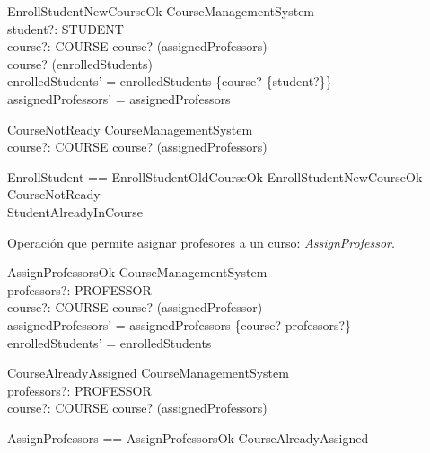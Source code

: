 \documentclass{article}
\begin{document}
\begin{schema}{EnrollStudentNewCourseOk}
    \Delta CourseManagementSystem \\
    student?: STUDENT \\
    course?: COURSE
    \where
    course? \in \dom(assignedProfessors) \\
    course? \nin \dom(enrolledStudents) \\
    enrolledStudents' = enrolledStudents \cup \{course? \mapsto \{student?\}\} \\
    assignedProfessors' = assignedProfessors
\end{schema}

\begin{schema}{CourseNotReady}
\Xi CourseManagementSystem \\
course?: COURSE
\where
    course? \nin \dom(assignedProfessors)
\end{schema}

\begin{zed}
    EnrollStudent == EnrollStudentOldCourseOk  \lor EnrollStudentNewCourseOk \lor CourseNotReady \\ \hspace{2.5cm} \lor StudentAlreadyInCourse
\end{zed}

Operación que permite asignar profesores a un curso: \textit{AssignProfessor}.

\begin{schema}{AssignProfessorsOk}
    \Delta CourseManagementSystem \\
    professors?: \power PROFESSOR \\
    course?: COURSE
    \where
    course? \notin \dom(assignedProfessor) \\
    assignedProfessors' = assignedProfessors \cup \{course? \mapsto professors?\} \\
    enrolledStudents' = enrolledStudents
\end{schema}

\begin{schema}{CourseAlreadyAssigned}
    \Xi CourseManagementSystem \\
    professors?: \power PROFESSOR \\
    course?: COURSE
    \where
    course? \in \dom(assignedProfessors)
\end{schema}

\begin{zed}
    AssignProfessors == AssignProfessorsOk \lor CourseAlreadyAssigned
\end{zed}
\end{document}
